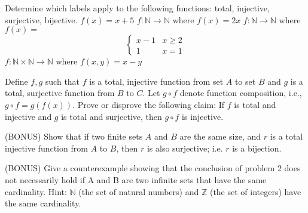 \documentclass[solution, letterpaper]{cs20inclass}
\begin{document}
\begin{solution}
\end{solution}

\problem Determine which labels apply to the following functions: total, injective, surjective, bijective.
\subproblem $f(x) = x + 5$
\subproblem $f : \mathds{N} \rightarrow \mathds{N}$ where $f(x) = 2x$
\subproblem  $f : \mathds{N} \rightarrow \mathds{N}$ where
$f(x) =$
\[ \begin{cases} 
      x-1 & x \geq 2 \\
      1 & x = 1
   \end{cases}
\]
\subproblem $f : \mathds{N} \times \mathds{N} \rightarrow \mathds{N}$ where $f(x, y) = x - y$

\begin{solution}
\end{solution}

\problem Define $f, g$ such that $f$ is a total, injective function from set $A$ to set $B$ and $g$ is a total, surjective function from $B$ to $C$. Let $g \circ f$ denote function composition, i.e., $g \circ f=g(f(x))$. Prove or disprove the following claim: If $f$ is total and injective and $g$ is total and surjective, then $g \circ f$ is injective.

\begin{solution}
\end{solution}


\problem (BONUS) Show that if two finite sets $A$ and $B$ are the same size, and $r$ is a total injective function from $A$ to $B$, then $r$ is also surjective; i.e. $r$ is a bijection.

\begin{solution}
\end{solution}

\problem (BONUS) Give a counterexample showing that the conclusion of problem 2 does not necessarily hold if A and B are two infinite sets that have the same cardinality. Hint: $\mathds{N}$ (the set of natural numbers) and $\mathds{Z}$ (the set of integers) have the same cardinality.


\begin{solution}
\end{solution}
\end{document}
